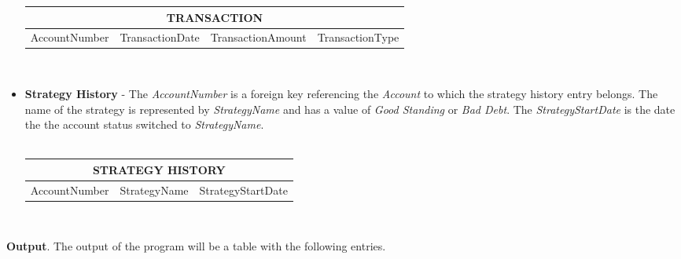 \documentclass[letterpaper,12pt,titlepage]{article}
\begin{document}
\begin{itemize}
\begin{tabular}[c]{|l|l|l|l|}
      \hline
      \multicolumn{4}{|c|}{TRANSACTION} \\
      \hline
      AccountNumber & TransactionDate & TransactionAmount & TransactionType \\
      \hline
      \end{tabular}\\
    \item \textbf{Strategy History} - The \textit{AccountNumber} is a foreign
	  key referencing the \textit{Account} to which the strategy history
	  entry belongs. The name of the strategy is represented by
	  \textit{StrategyName} and has a value of \textit{Good Standing} or
	  \textit{Bad Debt}. The \textit{StrategyStartDate} is the date the
	  the account status switched to \textit{StrategyName}.\\\\
      \begin{tabular}[c]{|l|l|l|} 
      \hline
      \multicolumn{3}{|c|}{STRATEGY HISTORY} \\
      \hline
      AccountNumber & StrategyName & StrategyStartDate \\
      \hline
      \end{tabular}\\
\end{itemize}
\pagebreak
\textbf{Output}. The output of the program will be a table with the following
entries.
\end{document}
